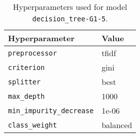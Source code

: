 \begin{table}[H]
\centering
\capstart
\begin{tabularx}{0.48\textwidth}{|X|l|}
\hline
Hyperparameter & Value \\
\hline
\texttt{preprocessor} & tfidf \\
\texttt{criterion} & gini \\
\texttt{splitter} & best \\
\texttt{max\_depth} & 1000 \\
\texttt{min\_impurity\_decrease} & 1e-06 \\
\texttt{class\_weight} & balanced \\
\hline
\end{tabularx}
\caption{Hyperparameters used for model \texttt{decision\_tree-G1-5}.}
\label{tab:hyperparameters_best_decision_tree}

\end{table}
